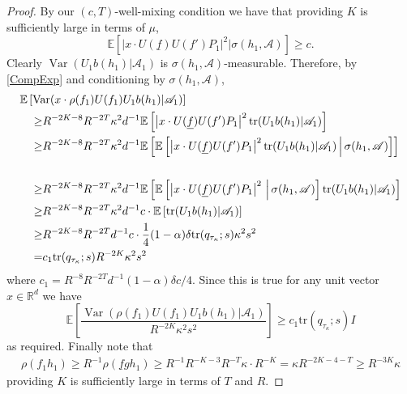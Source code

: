 \documentclass[10pt, english,oneside,reqno]{amsart}
\theoremstyle{plain}
\newtheorem{proposition}[theorem]{Proposition}
\theoremstyle{remark}
\numberwithin{equation}{section}
\numberwithin{figure}{section}
\DeclareMathOperator{\var}{Var}
\newcommand{\tr}{\mathrm{tr}}
\newcommand{\Z}{\mathbb{Z}}
\newcommand{\R}{\mathbb{R}}
\begin{document}
\begin{proof}
    By our $(c, T)$-well-mixing condition we have that providing $K$ is sufficiently large in terms of $\mu$, $$\mathbb{E}\left[ \left| x \cdot U(\underline{f}) U(f') P_1 \right|^2 | \sigma(h_1, \mathscr{A}) \right] \geq c.$$ Clearly $\var(U_1 b(h_1) | \mathscr{A}_1)$ is $\sigma(h_1, \mathscr{A})$-measurable. Therefore, by \eqref{CompExp} and conditioning by $\sigma(h_1, \mathscr{A})$,
    \begin{align*}
         \MoveEqLeft \mathbb{E}\left[\var(x \cdot \rho(f_1) U(f_1) U_1 b(h_1)| \mathscr{A}_1)\right] \\ 
         \geq &  R^{-2K-8} R^{-2T}\kappa^2 d^{-1}  \mathbb{E}\left[\left| x \cdot U(\underline{f}) U(f') P_1 \right|^2 \tr (U_1 b(h_1) | \mathscr{A}_1)  \right] \\ 
         \geq &  R^{-2K-8} R^{-2T}\kappa^2 d^{-1} \mathbb{E}\left[ \mathbb{E}\left[ \left| x \cdot U(\underline{f}) U(f') P_1 \right|^2 \tr (U_1 b(h_1) | \mathscr{A}_1)  \, \Big| \,\sigma(h_1,\mathscr{A}) \right]\right] \\
         \\ 
         \geq & R^{-2K-8} R^{-2T}\kappa^2 d^{-1} \mathbb{E}\left[ \mathbb{E}\left[ \left| x \cdot U(\underline{f}) U(f') P_1 \right|^2  \, \Big| \,\sigma(h_1,\mathscr{A}) \right] \tr (U_1 b(h_1) | \mathscr{A}_1) \right] \\
         \geq & R^{-2K-8} R^{-2T}\kappa^2 d^{-1}c \cdot\mathbb{E}\left[ \tr (U_1 b(h_1) | \mathscr{A}_1) \right] \\
        \geq &  R^{-2K-8} R^{-2T} d^{-1}c \cdot \frac{1}{4}(1 - \alpha) \delta \mathrm{tr}(q_{\tau_{\kappa}}; s)  \kappa^2 s^2 \\
        = &  c_1 \mathrm{tr}(q_{\tau_{\kappa}}; s) R^{-2K} \kappa^2 s^2
    \end{align*}
    where $c_1 = R^{-8} R^{-2T} d^{-1} (1 - \alpha) \delta c / 4$. Since this is true for any unit vector $x \in \R^d$ we have $$\mathbb{E}\left[\frac{\var(\rho(f_1) U(f_1) U_1 b(h_1)| \mathscr{A}_1)}{R^{-2K} \kappa^2 s^2}\right] \geq c_1 \mathrm{tr}(q_{\tau_{\kappa}}; s) I$$ as required. Finally note that
    \begin{align*}
        \rho(f_1 h_1) \geq R^{-1} \rho(\underline{f} g h_1) \geq R^{-1} R^{-K-3}R^{-T} \kappa \cdot R^{-K} = \kappa  R^{-2K-4-T} \geq R^{-3K}\kappa 
    \end{align*}
    providing $K$ is sufficiently large in terms of $T$ and $R$.
\end{proof}

    
\end{document}
